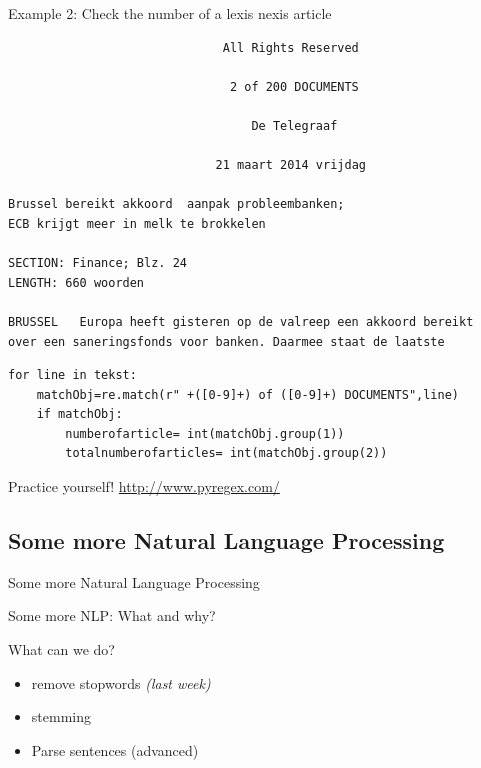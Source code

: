 \documentclass{beamer}
\begin{document}
\begin{frame}[fragile]{Example 2: Check the number of a lexis nexis article}
\begin{lstlisting}
                              All Rights Reserved

                               2 of 200 DOCUMENTS

                                  De Telegraaf

                             21 maart 2014 vrijdag

Brussel bereikt akkoord  aanpak probleembanken;
ECB krijgt meer in melk te brokkelen

SECTION: Finance; Blz. 24
LENGTH: 660 woorden

BRUSSEL   Europa heeft gisteren op de valreep een akkoord bereikt 
over een saneringsfonds voor banken. Daarmee staat de laatste
\end{lstlisting}

\begin{lstlisting}
for line in tekst:
    matchObj=re.match(r" +([0-9]+) of ([0-9]+) DOCUMENTS",line)
    if matchObj:
        numberofarticle= int(matchObj.group(1))
        totalnumberofarticles= int(matchObj.group(2))
\end{lstlisting}
\end{frame}


\begin{frame}{Practice yourself!}
\huge{\url{http://www.pyregex.com/}}
\end{frame}

\subsection{Some more Natural Language Processing}
\begin{frame}
Some more Natural Language Processing
\end{frame}



\begin{frame}{Some more NLP: What and why?}
\begin{block}{What can we do?}
\begin{itemize}
\item<1-> remove stopwords \emph{(last week)}
\item<2-> stemming
\item<3-> Parse sentences (advanced)
\end{itemize}
\end{block}
\end{frame}
\end{document}
